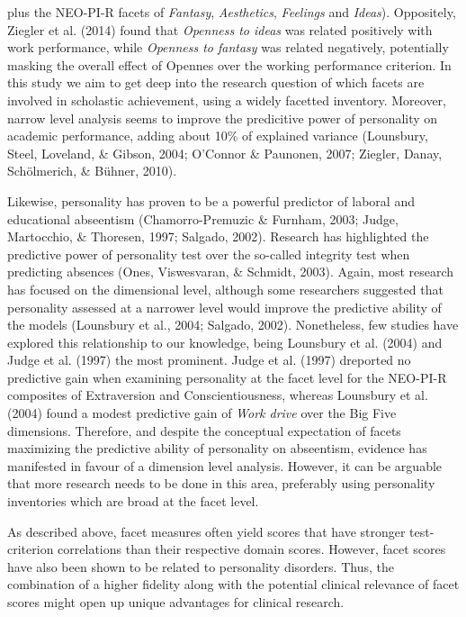 \documentclass[,man,floatsintext]{apa6}
\begin{document}
plus the NEO-PI-R facets of \emph{Fantasy}, \emph{Aesthetics},
\emph{Feelings} and \emph{Ideas}). Oppositely, Ziegler et al. (2014)
found that \emph{Openness to ideas} was related positively with work
performance, while \emph{Openness to fantasy} was related negatively,
potentially masking the overall effect of Opennes over the working
performance criterion. In this study we aim to get deep into the
research question of which facets are involved in scholastic
achievement, using a widely facetted inventory. Moreover, narrow level
analysis seems to improve the predicitive power of personality on
academic performance, adding about 10\% of explained variance
(Lounsbury, Steel, Loveland, \& Gibson, 2004; O'Connor \& Paunonen,
2007; Ziegler, Danay, Schölmerich, \& Bühner, 2010).

Likewise, personality has proven to be a powerful predictor of laboral
and educational abseentism (Chamorro-Premuzic \& Furnham, 2003; Judge,
Martocchio, \& Thoresen, 1997; Salgado, 2002). Research has highlighted
the predictive power of personality test over the so-called integrity
test when predicting absences (Ones, Viswesvaran, \& Schmidt, 2003).
Again, most research has focused on the dimensional level, although some
researchers suggested that personality assessed at a narrower level
would improve the predictive ability of the models (Lounsbury et al.,
2004; Salgado, 2002). Nonetheless, few studies have explored this
relationship to our knowledge, being Lounsbury et al. (2004) and Judge
et al. (1997) the most prominent. Judge et al. (1997) dreported no
predictive gain when examining personality at the facet level for the
NEO-PI-R composites of Extraversion and Conscientiousness, whereas
Lounsbury et al. (2004) found a modest predictive gain of \emph{Work
drive} over the Big Five dimensions. Therefore, and despite the
conceptual expectation of facets maximizing the predictive ability of
personality on abseentism, evidence has manifested in favour of a
dimension level analysis. However, it can be arguable that more research
needs to be done in this area, preferably using personality inventories
which are broad at the facet level.

As described above, facet measures often yield scores that have stronger
test-criterion correlations than their respective domain scores.
However, facet scores have also been shown to be related to personality
disorders. Thus, the combination of a higher fidelity along with the
potential clinical relevance of facet scores might open up unique
advantages for clinical research.
\end{document}
